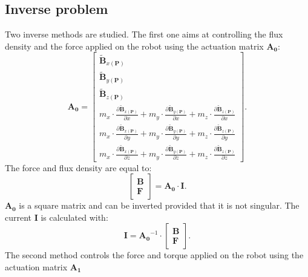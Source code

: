 \subsection{Inverse problem}
Two inverse methods are studied. The first one aims at controlling the flux density and the force applied on the robot using the actuation matrix $\mathbf{A_0}$:
%
\begin{equation}
\mathbf{A_0}=\begin{bmatrix}
\mathbf{\widetilde{B}}_{x(\mathbf{P})}
\\
\mathbf{\widetilde{B}}_{y(\mathbf{P})}
\\ 
\mathbf{\widetilde{B}}_{z(\mathbf{P})}
\\ 
m_x\cdot\frac{{\partial {\mathbf{\widetilde{B}}}_{x(\mathbf{P})}}}{\partial x}+m_y\cdot\frac{{\partial {\mathbf{\widetilde{B}}}_{y(\mathbf{P})}}}{\partial x}+m_z\cdot\frac{{\partial {\mathbf{\widetilde{B}}}_{z(\mathbf{P})}}}{\partial x}
\\ 
m_x\cdot\frac{{\partial {\mathbf{\widetilde{B}}}_{x(\mathbf{P})}}}{\partial y}+m_y\cdot\frac{{\partial {\mathbf{\widetilde{B}}}_{y(\mathbf{P})}}}{\partial y}+m_z\cdot\frac{{\partial {\mathbf{\widetilde{B}}}_{z(\mathbf{P})}}}{\partial y}
\\ 
m_x\cdot\frac{{\partial {\mathbf{\widetilde{B}}}_{x(\mathbf{P})}}}{\partial z}+m_y\cdot\frac{{\partial {\mathbf{\widetilde{B}}}_{y(\mathbf{P})}}}{\partial z}+m_z\cdot\frac{{\partial {\mathbf{\widetilde{B}}}_{z(\mathbf{P})}}}{\partial z}
\end{bmatrix}.
\end{equation}
%
The force and flux density are equal to:
\begin{equation}
\label{FullEq}
\begin{bmatrix}
\mathbf{B}
\\ 
\mathbf{F}
\end{bmatrix}=\mathbf{A_0}\cdot\mathbf{I}.
\end{equation}
$\mathbf{A_0}$ is a square matrix and can be inverted provided that it is not singular. The current $\mathbf{I}$ is calculated with:
%
\begin{equation}
\mathbf{I}=\mathbf{A_0}^{-1}\cdot\begin{bmatrix}
\mathbf{B}
\\ 
\mathbf{F}
\end{bmatrix}.
\end{equation}
%
The second method controls the force and torque applied on the robot using the actuation matrix $\mathbf{A_1}$
%
